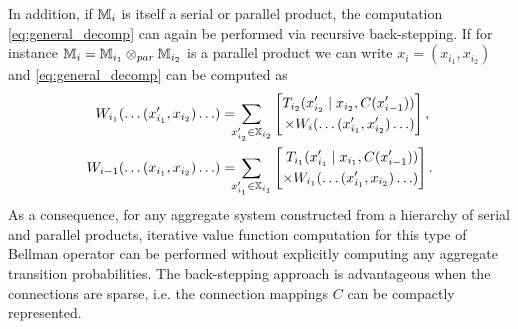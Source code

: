 \documentclass[conference]{IEEEtran}
\begin{document}
In addition, if $\mathbb{M}_{i}$ is itself a serial or parallel product, the computation \eqref{eq:general_decomp} can again be performed via recursive back-stepping. If for instance $\mathbb{M}_{i} = \mathbb{M}_{i_1} \otimes_{par} \mathbb{M}_{i_2}$ is a parallel product we can write $x_i = (x_{i_1}, x_{i_2})$ and \eqref{eq:general_decomp} can be computed as
\begin{equation*}
\begin{aligned}
  W_{i_1}(\ldots (x_{i_1}', x_{i_2}) \ldots) & = \hspace{-2mm} \sum_{x_{i_2}'  \in \X_{i_2}} \left[ \begin{aligned} T_{i_2}(x_{i_2}' \mid x_{i_2}, C(x_{i-1}') ) \\ \times W_i(\ldots (x_{i_1}', x_{i_2}') \ldots) \end{aligned} \right], \\
  W_{i-1}(\ldots (x_{i_1}, x_{i_2}) \ldots)  & =  \hspace{-2mm} \sum_{x_{i_1}' \in \X_{i_1}} \left[ \begin{aligned} T_{i_1}(x_{i_1}' \mid x_{i_1}, C(x_{i-1}') ) \\
  	\times W_{i_1}(\ldots (x_{i_1}', x_{i_2}) \ldots)
  \end{aligned} \right].
\end{aligned}
\end{equation*}
As a consequence, for any aggregate system constructed from a hierarchy of serial and parallel products, iterative value function computation for this type of Bellman operator can be performed without explicitly computing any aggregate transition probabilities. The back-stepping approach is advantageous when the connections are sparse, i.e. the connection mappings $C$ can be compactly represented.
\end{document}
